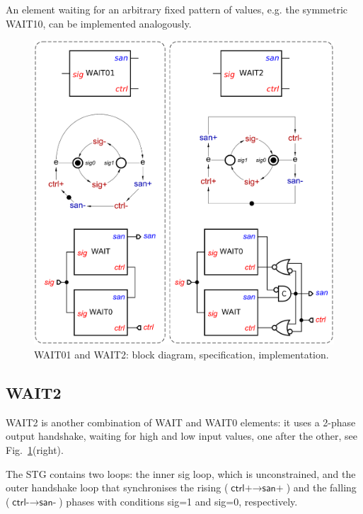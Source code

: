\documentclass[conference]{IEEEtran}
\begin{document}
An element waiting for an arbitrary fixed pattern of values, e.g. the symmetric
\textsf{WAIT10}, can be implemented analogously.

\begin{figure}
\begin{center}
    \includegraphics[scale=0.23]{fig/WAIT01-and-WAIT2.pdf}
    \caption{\textsf{WAIT01} and \textsf{WAIT2}: block diagram,
    specification, implementation.}
    \label{fig:wait012}
    \vspace{-5mm}
\end{center}
\end{figure}

\subsection*{\textsf{WAIT2}}

\textsf{WAIT2} is another combination of \textsf{WAIT} and \textsf{WAIT0} elements:
it uses a 2-phase output handshake, waiting for high and low input values, one after
the other, see Fig.~\ref{fig:wait012}(right).

The STG contains two loops: the inner \textsf{sig} loop, which is unconstrained, and
the outer handshake loop that synchronises the rising
($\textsf{ctrl+} \longrightarrow \textsf{san+}$)
 and the falling
($\textsf{ctrl-} \longrightarrow \textsf{san-}$)
phases with conditions \textsf{sig=1} and \textsf{sig=0}, respectively.
\end{document}
